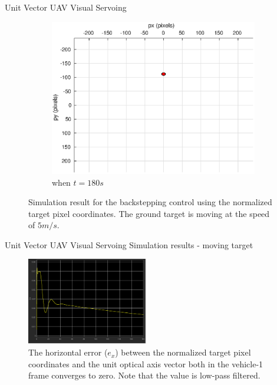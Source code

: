 \documentclass[9pt]{beamer}
\begin{document}
\begin{frame}{Unit Vector UAV Visual Servoing}
\begin{figure}[htbp]
\begin{subfigure}[t]{0.32\linewidth}
		\includegraphics[width=\textwidth]{chapter4/image_camera_5mps_180s}
		\caption{when $t=180s$}
	\end{subfigure}	
	\caption{Simulation result for the backstepping control using the normalized target pixel coordinates. The ground target is moving at the speed of $5m/s$.}
	\label{image_5mps}
\end{figure}
\end{frame}

\begin{frame}{Unit Vector UAV Visual Servoing}
Simulation results - moving target
\begin{figure}[htbp]
	\centering
	\includegraphics[height=1.5in]{chapter4/image_Ex_5mps}
	\caption{The horizontal error ($e_x$) between the normalized target pixel coordinates and the unit optical axis vector both in the vehicle-1 frame converges to zero. Note that the value is low-pass filtered.}
\end{figure}
\end{frame}
\end{document}
